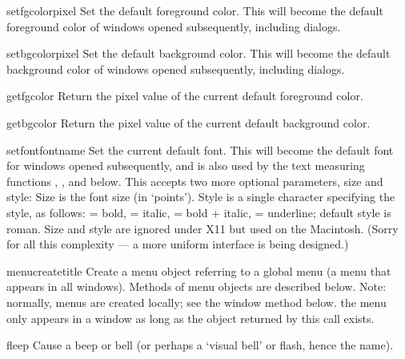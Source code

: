 \begin{funcdesc}{setfgcolor}{pixel}
Set the default foreground color.
This will become the default foreground color of windows opened
subsequently, including dialogs.
\end{funcdesc}

\begin{funcdesc}{setbgcolor}{pixel}
Set the default background color.
This will become the default background color of windows opened
subsequently, including dialogs.
\end{funcdesc}

\begin{funcdesc}{getfgcolor}{}
Return the pixel value of the current default foreground color.
\end{funcdesc}

\begin{funcdesc}{getbgcolor}{}
Return the pixel value of the current default background color.
\end{funcdesc}

\begin{funcdesc}{setfont}{fontname}
Set the current default font.
This will become the default font for windows opened subsequently,
and is also used by the text measuring functions ,
,  and  below.
This accepts two more optional parameters, size and style:
Size is the font size (in `points').
Style is a single character specifying the style, as follows:
 = bold,
 = italic,
 = bold + italic,
 = underline;
default style is roman.
Size and style are ignored under X11 but used on the Macintosh.
(Sorry for all this complexity --- a more uniform interface is being designed.)
\end{funcdesc}

\begin{funcdesc}{menucreate}{title}
Create a menu object referring to a global menu (a menu that appears in
all windows).
Methods of menu objects are described below.
Note: normally, menus are created locally; see the window method
 below.
 the menu only appears in a window as long as the object
returned by this call exists.
\end{funcdesc}

\begin{funcdesc}{fleep}{}
Cause a beep or bell (or perhaps a `visual bell' or flash, hence the
name).
\end{funcdesc}

